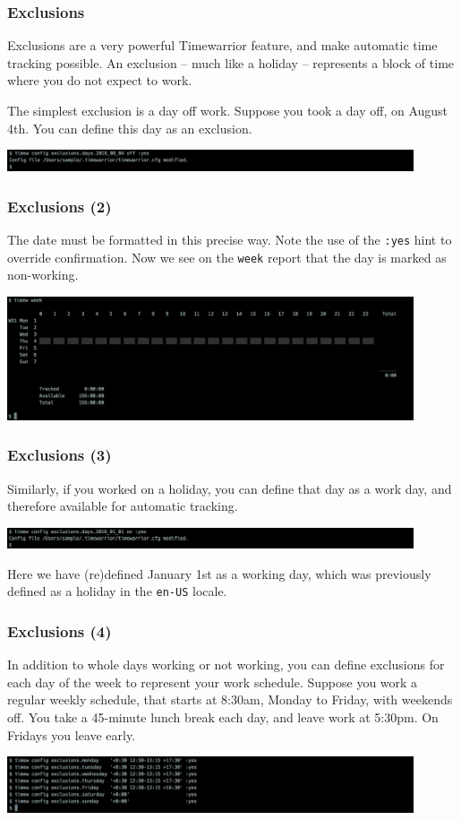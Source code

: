 \documentclass[t,handout]{beamer}
\begin{document}
\begin{frame}[fragile]\frametitle{Exclusions}
    Exclusions are a very powerful Timewarrior feature, and make automatic time tracking possible. An exclusion -- much like a holiday -- represents a block of time where you do not expect to work.

    The simplest exclusion is a day off work. Suppose you took a day off, on August 4th. You can define this day as an exclusion.

    \includegraphics[width=12cm]{images/tutorial30.png}
\end{frame}

\begin{frame}[fragile]\frametitle{Exclusions (2)}
    The date must be formatted in this precise way. Note the use of the \verb=:yes= hint to override confirmation. Now we see on the \verb=week= report that the day is marked as non-working.

    \includegraphics[width=12cm]{images/tutorial31.png}
\end{frame}

\begin{frame}[fragile]\frametitle{Exclusions (3)}
    Similarly, if you worked on a holiday, you can define that day as a work day, and therefore available for automatic tracking.

    \includegraphics[width=12cm]{images/tutorial32.png}

    Here we have (re)defined January 1st as a working day, which was previously defined as a holiday in the \verb=en-US= locale.
\end{frame}

\begin{frame}[fragile]\frametitle{Exclusions (4)}
    In addition to whole days working or not working, you can define exclusions for each day of the week to represent your work schedule. Suppose you work a regular weekly schedule, that starts at 8:30am, Monday to Friday, with weekends off. You take a 45-minute lunch break each day, and leave work at 5:30pm. On Fridays you leave early.

    \includegraphics[width=12cm]{images/tutorial33.png}
\end{frame}
\end{document}
